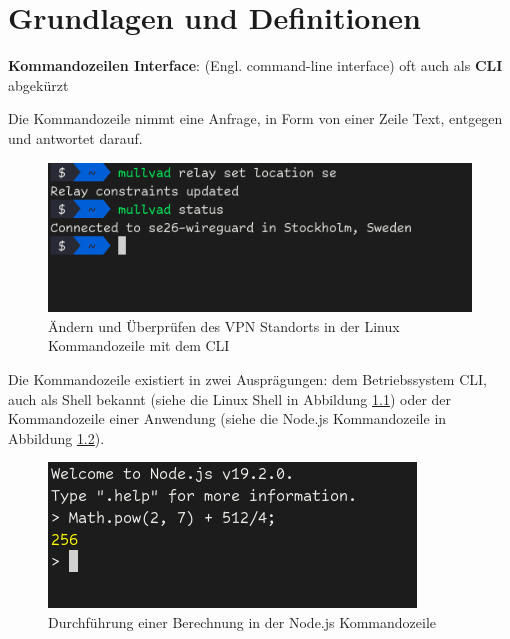 \documentclass[oneside,bibliography=totocnumbered,BCOR=5mm]{scrbook}
\begin{document}
\chapter{Grundlagen und Definitionen}


\textbf{Kommandozeilen Interface}: (Engl. command-line interface) oft auch als \textbf{CLI} abgekürzt

Die Kommandozeile nimmt eine Anfrage, in Form von einer Zeile Text, entgegen und antwortet darauf.

\begin{figure}
  \centering
  \includegraphics[scale=0.5]{mullvad-status.png}
  \caption{Ändern und Überprüfen des VPN Standorts in der Linux Kommandozeile mit dem  CLI}
  \label{fig:mullvad-status}
\end{figure}

Die Kommandozeile existiert in zwei Ausprägungen: dem Betriebssystem CLI, auch
als Shell bekannt (siehe die Linux Shell in Abbildung \ref{fig:mullvad-status})
oder der Kommandozeile einer Anwendung (siehe die Node.js Kommandozeile in
Abbildung \ref{fig:node-calc}).

\begin{figure}
  \centering
  \includegraphics[scale=0.5]{node-calc.png}
  \caption{Durchführung einer Berechnung in der Node.js Kommandozeile}
  \label{fig:node-calc}
\end{figure}
\end{document}
